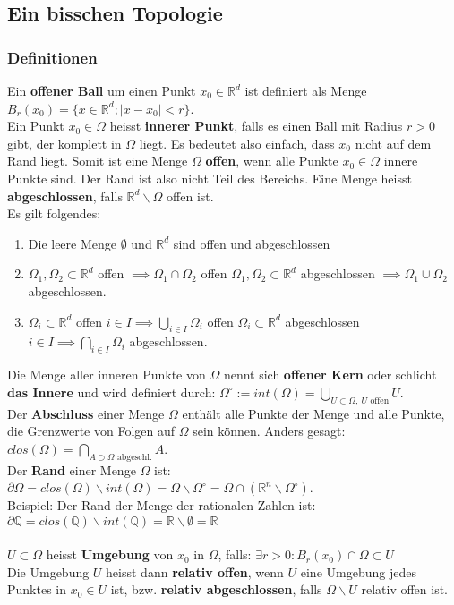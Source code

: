 \documentclass[a4paper,10pt]{scrartcl}
\begin{document}
\subsection{Ein bisschen Topologie}
\subsubsection{Definitionen}
Ein \textbf{offener Ball} um einen Punkt $x_0\in\mathbb{R}^d$ ist definiert als Menge $B_r(x_0)=\{ x\in\mathbb{R}^d; |x-x_0|<r \}$.\\
Ein Punkt $x_0\in\Omega$ heisst \textbf{innerer Punkt}, falls es einen Ball mit Radius $r>0$ gibt, der komplett in $\Omega$ liegt. Es bedeutet also einfach, dass $x_0$ nicht auf dem Rand liegt. Somit ist eine Menge $\Omega$ \textbf{offen}, wenn alle Punkte $x_0\in\Omega$ innere Punkte sind. Der Rand ist also nicht Teil des Bereichs.
Eine Menge heisst \textbf{abgeschlossen}, falls $\mathbb{R}^d\backslash \Omega$ offen ist. \\
Es gilt folgendes: 
\begin{enumerate} [label=$\circ$]
	\item Die leere Menge $\emptyset$ und $\mathbb{R}^d$ sind offen und abgeschlossen
	\item $\Omega_1, \Omega_2 \subset \mathbb{R}^d$ offen $\implies \Omega_1\cap \Omega_2 $ offen \qquad 
	$\Omega_1, \Omega_2 \subset \mathbb{R}^d$ abgeschlossen $\implies \Omega_1\cup \Omega_2 $ abgeschlossen. 
	\item $\Omega_i\subset \mathbb{R}^d$ offen $i\in I \implies \bigcup\limits_{i\in I} \Omega_i$ offen \qquad
	$\Omega_i\subset \mathbb{R}^d$ abgeschlossen $i\in I \implies \bigcap\limits_{i\in I} \Omega_i$ abgeschlossen.
\end{enumerate}
Die Menge aller inneren Punkte von $\Omega$ nennt sich \textbf{offener Kern} oder schlicht \textbf{das Innere} und wird definiert durch: $\Omega^\circ:= int(\Omega) = \bigcup\limits_{U\subset \Omega,\ U \text{ offen}} U$.\\
Der \textbf{Abschluss} einer Menge $\Omega$ enthält alle Punkte der Menge und alle Punkte, die Grenzwerte von Folgen auf $\Omega$ sein können. Anders gesagt: $clos(\Omega)= \bigcap\limits_{A\supset\Omega \text{ abgeschl.}}A$.\\
Der \textbf{Rand} einer Menge $\Omega$ ist: $\partial \Omega = clos(\Omega)\backslash int(\Omega) = \overline{\Omega}\backslash \Omega^\circ = \overline{\Omega} \cap (\mathbb{R}^n\backslash\Omega^\circ)$. \\
Beispiel: Der Rand der Menge der rationalen Zahlen ist: $\partial \mathbb{Q}= clos(\mathbb{Q})\backslash int(\mathbb{Q}) = \mathbb{R}\backslash \emptyset=\mathbb{R}$\\\\
$U\subset \Omega$ heisst \textbf{Umgebung} von $x_0$ in $\Omega$, falls: $\exists r>0: B_r(x_0)\cap \Omega \subset U$\\
Die Umgebung $U$ heisst dann \textbf{relativ offen}, wenn $U$ eine Umgebung jedes Punktes in $x_0\in U$ ist, bzw. \textbf{relativ abgeschlossen}, falls $\Omega \backslash U$ relativ offen ist. 
\end{document}

